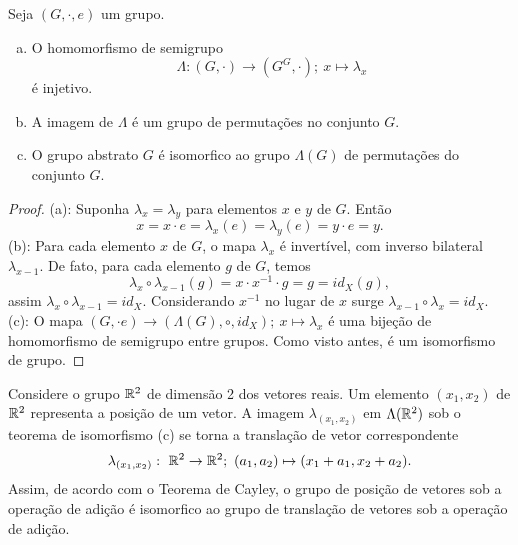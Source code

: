 \begin{definition}[Magma]
   \begin{theorem}
      Seja $(G, \cdot , e)$ um grupo.
      \begin{enumerate}[(a)]
         \item O homomorfismo de semigrupo $$\Lambda: (G, \cdot) \to (G^{G}, \cdot);\ x\mapsto \lambda_{x}$$ é injetivo.
         \item A imagem de $\Lambda$ é um grupo de permutações no conjunto $G$.
         \item O grupo abstrato $G$ é isomorfico ao grupo $\Lambda(G)$ de permutações do conjunto $G$.
      \end{enumerate}
      \begin{proof}
         (a): Suponha $\lambda_{x} = \lambda_{y}$ para elementos $x$ e $y$ de $G$. Então 
         $$x = x \cdot e = \lambda_{x}(e) = \lambda_{y}(e) = y \cdot e = y.$$ (b): Para cada elemento $x$ de $G$, o mapa $\lambda_{x}$ é invertível, com inverso bilateral $\lambda_{x-1}.$ De fato, para cada elemento $g$ de $G$, temos 
         $$\lambda_{x}\circ \lambda_{x-1}(g) = x \cdot x^{-1} \cdot g = g = id_{X}(g),$$ assim $\lambda_{x}\circ \lambda_{x-1} = id_{X}$. Considerando $x^{-1}$ no lugar de $x$ surge $\lambda_{x-1} \circ \lambda_{x} = id_{X}.$
         (c): O mapa $(G,\cdot e) \to (\Lambda(G), \circ, id_{X});\ x \mapsto \lambda_{x}$ é uma bijeção de homomorfismo de semigrupo entre grupos. Como visto antes, é um isomorfismo de grupo.
      \end{proof}
   \end{theorem}

   \begin{exmp}
      Considere o grupo $\R^{2}$ de dimensão 2 dos vetores reais. Um elemento $(x_{1},x_{2})$ de $\R^{2}$ representa a posição de um vetor. A imagem $\lambda_{(x_{1},x_{2})}$ em $\Lambda(\R^{2})$ sob o teorema de isomorfismo (c) se torna a translação de vetor correspondente $$\lambda_{(x_{1},x_{2})}:\ \R^{2} \to \R^{2};\ (a_{1},a_{2}) \mapsto (x_{1} + a_{1}, x_{2} + a_{2}).$$
      Assim, de acordo com o Teorema de Cayley, o grupo de posição de vetores sob a operação de adição é isomorfico ao grupo de translação de vetores sob a operação de adição.
   \end{exmp}
   \begin{center}
      
      \begin{tikzpicture}[x=0.75pt,y=0.75pt,yscale=-1,xscale=1]
         

\end{tikzpicture}
\end{center}
\end{definition}
